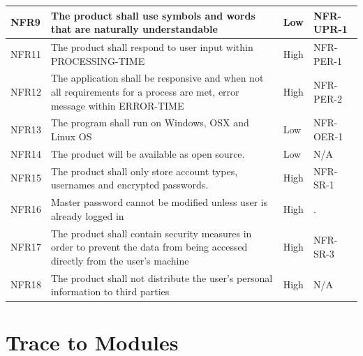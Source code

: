 \documentclass[12pt, titlepage]{article}
\begin{document}
\begin{table}[!htbp]
    \begin{tabularx}{\textwidth}{p{2cm}Xp{2cm}X}
        \midrule

        NFR9  & The product shall use symbols and words that are naturally understandable & Low & NFR-UPR-1\\\hline
        NFR11 & The product shall respond to user input within PROCESSING-TIME & High & NFR-PER-1\\\hline
        NFR12 & The application shall be responsive and when not all requirements for a process are met, error message within ERROR-TIME & High & NFR-PER-2\\\hline
        NFR13 & The program shall run on Windows, OSX and Linux OS & Low & NFR-OER-1\\\hline
        NFR14 & The product will be available as open source. & Low & N/A\\\hline
        NFR15 & The product shall only store account types, usernames and encrypted passwords. & High & NFR-SR-1\\\hline
        NFR16 & Master password cannot be modified unless user is already logged in & High & . \\\hline
        NFR17 & The product shall contain security measures in order to prevent the data from being accessed directly from the user’s machine & High & NFR-SR-3\\\hline
        NFR18 & The product shall not distribute the user’s personal information to third parties & High & N/A\\

        \bottomrule

    \end{tabularx}
\end{table}
		
\section{Trace to Modules}	
\end{document}
